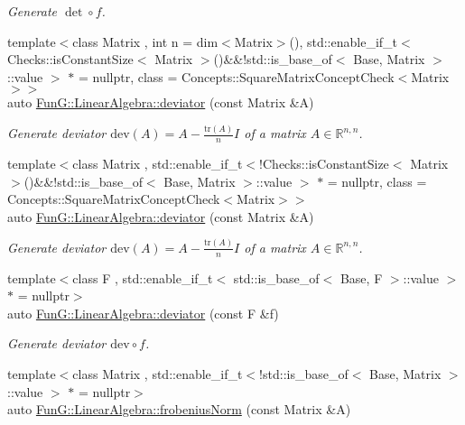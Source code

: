 \begin{DoxyCompactItemize}
\begin{DoxyCompactList}\small\item\em Generate $\det\circ f$. \end{DoxyCompactList}\item 
{\footnotesize template$<$class Matrix , int n = dim$<$\+Matrix$>$(), std\+::enable\+\_\+if\+\_\+t$<$ Checks\+::is\+Constant\+Size$<$ Matrix $>$()\&\&!std\+::is\+\_\+base\+\_\+of$<$ Base, Matrix $>$\+::value $>$ $\ast$  = nullptr, class  = Concepts\+::\+Square\+Matrix\+Concept\+Check$<$\+Matrix$>$$>$ }\\auto \hyperlink{group__LinearAlgebraGroup_ga7c0b1db93cfc5779a3b1e7eb1646c213}{Fun\+G\+::\+Linear\+Algebra\+::deviator} (const Matrix \&A)
\begin{DoxyCompactList}\small\item\em Generate deviator $ \mathrm{dev}(A) = A - \frac{\mathrm{tr}(A)}{n}I $ of a matrix $ A\in\mathbb{R}^{n,n} $. \end{DoxyCompactList}\item 
{\footnotesize template$<$class Matrix , std\+::enable\+\_\+if\+\_\+t$<$!\+Checks\+::is\+Constant\+Size$<$ Matrix $>$()\&\&!std\+::is\+\_\+base\+\_\+of$<$ Base, Matrix $>$\+::value $>$ $\ast$  = nullptr, class  = Concepts\+::\+Square\+Matrix\+Concept\+Check$<$\+Matrix$>$$>$ }\\auto \hyperlink{group__LinearAlgebraGroup_gabc90de0d1754cd2e2d190ea8ba62245f}{Fun\+G\+::\+Linear\+Algebra\+::deviator} (const Matrix \&A)
\begin{DoxyCompactList}\small\item\em Generate deviator $ \mathrm{dev}(A) = A - \frac{\mathrm{tr}(A)}{n}I $ of a matrix $ A\in\mathbb{R}^{n,n} $. \end{DoxyCompactList}\item 
{\footnotesize template$<$class F , std\+::enable\+\_\+if\+\_\+t$<$ std\+::is\+\_\+base\+\_\+of$<$ Base, F $>$\+::value $>$ $\ast$  = nullptr$>$ }\\auto \hyperlink{group__LinearAlgebraGroup_gad363f3add577abc046fc525ce83e22d3}{Fun\+G\+::\+Linear\+Algebra\+::deviator} (const F \&f)
\begin{DoxyCompactList}\small\item\em Generate deviator $ \mathrm{dev}\circ f$. \end{DoxyCompactList}\item 
{\footnotesize template$<$class Matrix , std\+::enable\+\_\+if\+\_\+t$<$!std\+::is\+\_\+base\+\_\+of$<$ Base, Matrix $>$\+::value $>$ $\ast$  = nullptr$>$ }\\auto \hyperlink{group__LinearAlgebraGroup_gaa893e7d667dde98d2b119ca004745186}{Fun\+G\+::\+Linear\+Algebra\+::frobenius\+Norm} (const Matrix \&A)

\end{DoxyCompactItemize}
